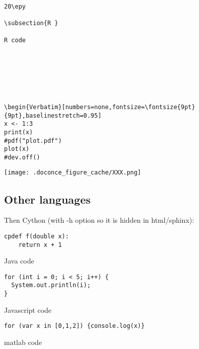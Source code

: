 \documentclass[%
oneside,                 %
final,                   %
chapterprefix=true,      %
open=right,              %
10pt]{book}
\begin{document}
\begin{Verbatim}[numbers=none,fontsize=\fontsize{9pt}{9pt},baselinestretch=0.95]
20\epy

\subsection{R }

R code







\begin{Verbatim}[numbers=none,fontsize=\fontsize{9pt}{9pt},baselinestretch=0.95]
x <- 1:3
print(x)
#pdf("plot.pdf")
plot(x)
#dev.off()

\end{Verbatim}

\begin{center}
   \texttt{[image: .doconce\_figure\_cache/XXX.png]}
\end{center}


\subsection{Other languages}

Then Cython (with -h option so it is hidden in html/sphinx):




\begin{Verbatim}[numbers=none,fontsize=\fontsize{9pt}{9pt},baselinestretch=0.95]
cpdef f(double x):
    return x + 1

\end{Verbatim}


Java code




\begin{Verbatim}[numbers=none,fontsize=\fontsize{9pt}{9pt},baselinestretch=0.95]
for (int i = 0; i < 5; i++) {
  System.out.println(i);
}

\end{Verbatim}


Javascript code


\begin{Verbatim}[numbers=none,fontsize=\fontsize{9pt}{9pt},baselinestretch=0.95]
for (var x in [0,1,2]) {console.log(x)}

\end{Verbatim}


matlab code
\end{document}
